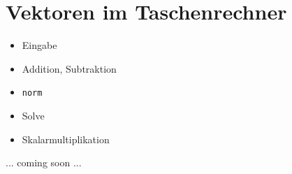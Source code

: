 \section{Vektoren im Taschenrechner}

\begin{itemize}
\item Eingabe
\item Addition, Subtraktion
\item \texttt{norm}
\item Solve
\item Skalarmultiplikation
\end{itemize}

... coming soon ...
